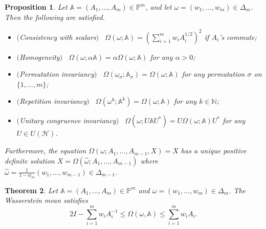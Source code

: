 \documentclass[12pt,reqno]{amsart}
\newtheorem{theorem}{Theorem}[section]
\newtheorem{proposition}[theorem]{Proposition}
\begin{document}
\begin{proposition}
Let $\mathbb{A} = (A_{1}, \dots, A_{m}) \in \mathbb{P}^{m}$, and let $\omega = (w_{1}, \dots, w_{m}) \in \Delta_{m}$. Then the following are satisfied.
\begin{itemize}
\item[(1)] $($Consistency with scalars$)$ \ $\displaystyle \Omega(\omega; \mathbb{A}) = \left( \sum_{i=1}^{m} w_{i} A_{i}^{1/2} \right)^{2}$ if $A_{i}$'s commute;

\item[(2)] $($Homogeneity$)$ \ $\Omega(\omega; \alpha \mathbb{A}) = \alpha \Omega(\omega; \mathbb{A})$ for any $\alpha > 0$;

\item[(3)] $($Permutation invariancy$)$ \ $\Omega(\omega_{\sigma}; \mathbb{A}_{\sigma}) = \Omega(\omega; \mathbb{A})$ for any permutation $\sigma$ on $\{ 1, \dots, m \}$;

\item[(4)] $($Repetition invariancy$)$ \ $\Omega(\omega^{k}; \mathbb{A}^{k}) = \Omega(\omega; \mathbb{A})$ for any $k \in \mathbb{N}$;

\item[(5)] $($Unitary congruence invariancy$)$ \ $\Omega(\omega; U \mathbb{A} U^{*}) = U \Omega(\omega; \mathbb{A}) U^{*}$ for any $U \in U(\mathcal{H})$.
\end{itemize}
Furthermore, the equation $\Omega(\omega; A_{1}, \dots, A_{m-1}, X) = X$ has a unique positive definite solution $X = \Omega(\hat{\omega}; A_{1}, \dots, A_{m-1})$ where $\hat{\omega} = \frac{1}{1-w_{m}} (w_{1}, \dots, w_{m-1}) \in \Delta_{m-1}$.
\end{proposition}


\begin{theorem}\label{T:bounded}
Let $\mathbb{A} = (A_1, \ldots, A_m) \in \mathbb{P}^m$ and $\omega = (w_{1}, \dots, w_{m}) \in \Delta_{m}$. The Wasserstein mean satisfies
\begin{displaymath}
2I - \sum_{i=1}^{m} w_{i} A_{i}^{-1} \leq \Omega (\omega, \mathbb{A}) \leq \sum_{i=1}^{m} w_{i} A_{i}.
\end{displaymath}
\end{theorem}
\end{document}
